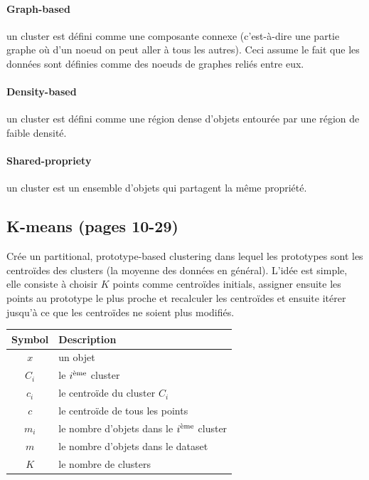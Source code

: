 \documentclass{article}
\begin{document}
\begin{sffamily}
\paragraph{Graph-based} un cluster est défini comme une composante connexe (c'est-à-dire une partie graphe où d'un noeud on peut aller à 
tous les autres). Ceci assume le fait que les données sont définies comme des noeuds de graphes reliés entre eux.

\paragraph{Density-based} un cluster est défini comme une région dense d'objets entourée par une région de faible densité.

\paragraph{Shared-propriety} un cluster est un ensemble d'objets qui partagent la même propriété.

\subsection{K-means (pages 10-29)}

Crée un partitional, prototype-based clustering dans lequel les prototypes sont les centroïdes des clusters (la moyenne des données en 
général). L'idée est simple, elle consiste à choisir $K$ points comme centroïdes initials, assigner ensuite les points au prototype le plus 
proche et recalculer les centroïdes et ensuite itérer jusqu'à ce que les centroïdes ne soient plus modifiés.

\begin{center}
\begin{tabular}{c|l}
\textbf{Symbol} & \textbf{Description} \\
\hline
$x$ & un objet \\
$C_i$ & le $i^\text{\text{ème}}$ cluster \\
$c_i$ & le centroïde du cluster $C_i$ \\
$c$ & le centroïde de tous les points \\
$m_i$ & le nombre d'objets dans le $i^\text{\text{ème}}$ cluster \\
$m$ & le nombre d'objets dans le dataset \\
$K$ & le nombre de clusters
\end{tabular}
\end{center}


\end{sffamily}
\end{document}
